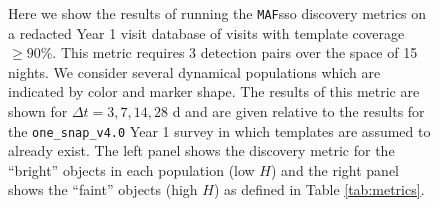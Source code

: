 \documentclass[preprintm,linenumbers]{aastex631}
\newcommand{\baseline}{\texttt{one\_snap\_v4.0}\xspace}
\newcommand{\maf}{\texttt{MAF}\xspace}
\begin{document}
\begin{figure}
\begin{tabular}{@{}c@{}c@{}}
			\end{tabular}
			\caption{Here we show the results of running the \maf \gls*{sso} discovery metrics on a redacted Year 1 visit database of visits with template coverage $\geq 90\%$.
				This metric requires 3 detection pairs over the space of 15 nights.
    We consider several dynamical populations which are indicated by color and marker shape.
				The results of this metric are shown for $\Delta t = 3, 7, 14, 28$ d and are given relative to the results for the \baseline Year 1 survey in which templates are assumed to already exist.
				The left panel shows the discovery metric for the ``bright'' objects in each population (low $H$) and the right panel shows the ``faint'' objects (high $H$) as defined in Table \ref{tab:metrics}.
			}
			\label{fig:temp_gen_discovery_metrics}
		\end{figure}
\end{document}
